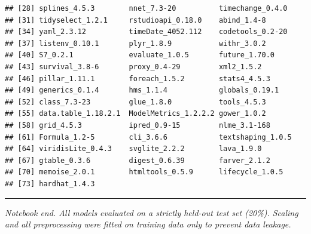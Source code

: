 \documentclass[
]{article}
\begin{document}
\begin{verbatim}
## [28] splines_4.5.3        nnet_7.3-20          timechange_0.4.0    
## [31] tidyselect_1.2.1     rstudioapi_0.18.0    abind_1.4-8         
## [34] yaml_2.3.12          timeDate_4052.112    codetools_0.2-20    
## [37] listenv_0.10.1       plyr_1.8.9           withr_3.0.2         
## [40] S7_0.2.1             evaluate_1.0.5       future_1.70.0       
## [43] survival_3.8-6       proxy_0.4-29         xml2_1.5.2          
## [46] pillar_1.11.1        foreach_1.5.2        stats4_4.5.3        
## [49] generics_0.1.4       hms_1.1.4            globals_0.19.1      
## [52] class_7.3-23         glue_1.8.0           tools_4.5.3         
## [55] data.table_1.18.2.1  ModelMetrics_1.2.2.2 gower_1.0.2         
## [58] grid_4.5.3           ipred_0.9-15         nlme_3.1-168        
## [61] Formula_1.2-5        cli_3.6.6            textshaping_1.0.5   
## [64] viridisLite_0.4.3    svglite_2.2.2        lava_1.9.0          
## [67] gtable_0.3.6         digest_0.6.39        farver_2.1.2        
## [70] memoise_2.0.1        htmltools_0.5.9      lifecycle_1.0.5     
## [73] hardhat_1.4.3
\end{verbatim}

\begin{center}\rule{0.5\linewidth}{0.5pt}\end{center}

\emph{Notebook end. All models evaluated on a strictly held-out test set
(20\%). Scaling and all preprocessing were fitted on training data only
to prevent data leakage.}
\end{document}
